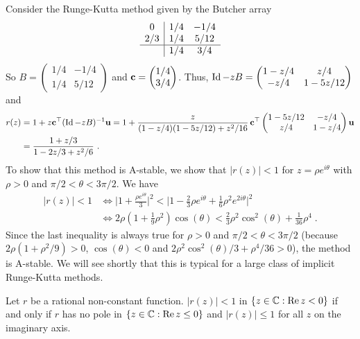 \begin{egg}
Consider the Runge-Kutta method given by the Butcher array
\[
\begin{array}{c|cc}
0 & 1/4 & -1/4 \\
2/3 & 1/4 & 5/12 \\
\hline
 & 1/4 & 3/4
\end{array}
\]
So
$B= \begin{pmatrix} 1/4 & -1/4 \\ 1/4 & 5/12 \end{pmatrix}$
and
$\mathbf{c}= \begin{pmatrix} 1/4 \\ 3/4 \end{pmatrix}$.  Thus,
$\operatorname{Id}-z B = \begin{pmatrix} 1-z/4 & z/4 \\ -z/4 & 1-5z/12 \end{pmatrix}$
and 
\begin{align*}
r(z) &= 1 +z\mathbf{c}^\top(\operatorname{Id}-z B)^{-1}\mathbf{u}
= 1+ \frac{z}{(1-z/4)(1-5z/12) + z^2/16}
\,\mathbf{c}^\top
\begin{pmatrix}
1-5z/12 & -z/4 \\
z/4 & 1 - z/4
\end{pmatrix}
\mathbf{u} \\
&= \frac{1+z/3}{1-2z/3+ z^2/6} \ .
\end{align*}
To show that this method is A-stable, we show that
$|r(z)| < 1$ for $z=\rho e^{i\theta}$ with $\rho>0$ and
$\pi/2 < \theta < 3\pi/2$.  We have
\begin{align*}
|r(z)| < 1 &\Leftrightarrow
\bigg| 1 + \frac{\rho e^{i\theta}}{3} \bigg|^2 <
\bigg| 1-\frac{2}{3}\rho e^{i\theta} +\frac{1}{6}\rho^2 e^{2i\theta}
\bigg|^2 \\
&\Leftrightarrow
2\rho (1+\frac{1}{9}\rho^2) \cos(\theta) <
\frac{2}{3} \rho^2 \cos^2(\theta) +\frac{1}{36} \rho^4 \; .
\end{align*}
Since the last inequality is always true for $\rho>0$ and
$\pi/2 < \theta < 3\pi/2$ (because
$2\rho (1+\rho^2/9) >0$, $\cos(\theta) <0$ and
$2\rho^2 \cos^2(\theta)/3 + \rho^4/36 > 0$), the
method is A-stable.  We will see shortly that this is typical for
a large class of implicit Runge-Kutta methods.
\label{AS_IRK}
\end{egg}

\begin{lemma}
Let $r$ be a rational non-constant function.  $|r(z)| <1$ in
$\{ z\in\mathbb{C} : \operatorname{Re} z<0\}$ if and only if $r$ has no pole
in $\{ z\in\mathbb{C} : \operatorname{Re} z\leq 0\}$ and $|r(z)| \leq 1$ for all $z$
on the imaginary axis.
\label{RKAstabPole}
\end{lemma}

